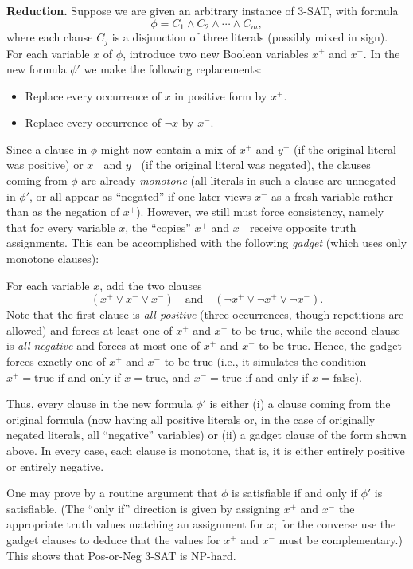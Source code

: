 \documentclass[letterpaper, 11pt]{article}
\newcommand{\1}{\mathds{1}}	%
\theoremstyle{definition}
\newenvironment{solution}{{\par\noindent\it Solution.}}{}
\begin{document}
\begin{solution}
\medskip
\noindent \textbf{Reduction.}  
Suppose we are given an arbitrary instance of 3-SAT, with formula
\[
\phi = C_1 \wedge C_2 \wedge \cdots \wedge C_m,
\]
where each clause \(C_j\) is a disjunction of three literals (possibly mixed in sign). For each variable \(x\) of \(\phi\), introduce two new Boolean variables \(x^+\) and \(x^-\). In the new formula \(\phi'\) we make the following replacements:
\begin{itemize}
    \item Replace every occurrence of \(x\) in positive form by \(x^+\).
    \item Replace every occurrence of \(\neg x\) by \(x^-\).
\end{itemize}
Since a clause in \(\phi\) might now contain a mix of \(x^+\) and \(y^+\) (if the original literal was positive) or \(x^-\) and \(y^-\) (if the original literal was negated), the clauses coming from \(\phi\) are already \emph{monotone} (all literals in such a clause are unnegated in \(\phi'\), or all appear as “negated” if one later views \(x^-\) as a fresh variable rather than as the negation of \(x^+\)). However, we still must force consistency, namely that for every variable \(x\), the “copies” \(x^+\) and \(x^-\) receive opposite truth assignments. This can be accomplished with the following \emph{gadget} (which uses only monotone clauses):

\medskip
For each variable \(x\), add the two clauses
\[
(x^+ \vee x^- \vee x^-)\quad \text{and}\quad (\neg x^+ \vee \neg x^+ \vee \neg x^-).
\]
Note that the first clause is \emph{all positive} (three occurrences, though repetitions are allowed) and forces at least one of \(x^+\) and \(x^-\) to be true, while the second clause is \emph{all negative} and forces at most one of \(x^+\) and \(x^-\) to be true. Hence, the gadget forces exactly one of \(x^+\) and \(x^-\) to be true (i.e., it simulates the condition \(x^+ = \text{true}\) if and only if \(x = \text{true}\), and \(x^- = \text{true}\) if and only if \(x = \text{false}\)).  

\medskip
Thus, every clause in the new formula \(\phi'\) is either (i) a clause coming from the original formula (now having all positive literals or, in the case of originally negated literals, all “negative” variables) or (ii) a gadget clause of the form shown above. In every case, each clause is monotone, that is, it is either entirely positive or entirely negative.

\medskip
One may prove by a routine argument that \(\phi\) is satisfiable if and only if \(\phi'\) is satisfiable. (The “only if” direction is given by assigning \(x^+\) and \(x^-\) the appropriate truth values matching an assignment for \(x\); for the converse use the gadget clauses to deduce that the values for \(x^+\) and \(x^-\) must be complementary.) This shows that Pos-or-Neg 3-SAT is NP-hard.


\end{solution}
\end{document}
